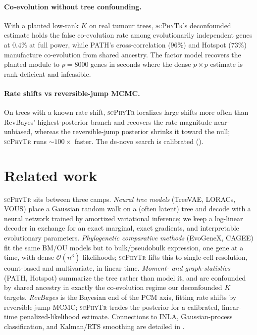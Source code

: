 \documentclass[11pt]{article}
\newcommand{\scphytr}{\textsc{scPhyTr}}
\newcommand{\bigO}{\mathcal{O}}
\begin{document}
\paragraph{Co-evolution without tree confounding.} With a planted low-rank $K$ on real tumour
trees, \scphytr{}'s deconfounded estimate holds the false co-evolution rate among
evolutionarily independent genes at $0.4\%$ at full power, while PATH's cross-correlation
($96\%$) and Hotspot ($73\%$) manufacture co-evolution from shared ancestry. The factor model
recovers the planted module to $p=8000$ genes in seconds where the dense $p\times p$ estimate
is rank-deficient and infeasible.

\paragraph{Rate shifts vs reversible-jump MCMC.} On trees with a known rate shift, \scphytr{}
localizes large shifts more often than RevBayes' highest-posterior branch and recovers the
rate magnitude near-unbiased, whereas the reversible-jump posterior shrinks it toward the null;
\scphytr{} runs ${\sim}100\times$ faster. The de-novo search is calibrated
().

\section{Related work}
\label{sec:related}

\scphytr{} sits between three camps. \emph{Neural tree models} (TreeVAE, LORACs, VOUS) place a
Gaussian random walk on a (often latent) tree and decode with a neural network trained by
amortized variational inference; we keep a log-linear decoder in exchange for an exact marginal,
exact gradients, and interpretable evolutionary parameters. \emph{Phylogenetic comparative
methods} (EvoGeneX, CAGEE) fit the same BM/OU models but to bulk/pseudobulk expression, one
gene at a time, with dense $\bigO(n^3)$ likelihoods; \scphytr{} lifts this to single-cell
resolution, count-based and multivariate, in linear time. \emph{Moment- and graph-statistics}
(PATH, Hotspot) summarize the tree rather than model it, and are confounded by shared ancestry
in exactly the co-evolution regime our deconfounded $K$ targets. \emph{RevBayes} is the
Bayesian end of the PCM axis, fitting rate shifts by reversible-jump MCMC; \scphytr{} trades the
posterior for a calibrated, linear-time penalized-likelihood estimate. Connections to INLA,
Gaussian-process classification, and Kalman/RTS smoothing are detailed in .
\end{document}
